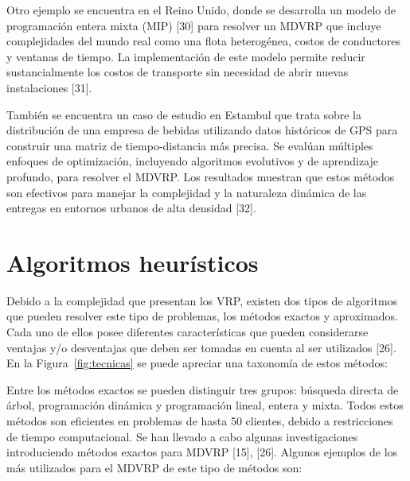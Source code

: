 Otro ejemplo se encuentra en el Reino Unido, donde se desarrolla un modelo de programaci\'on entera mixta (MIP) [30] para resolver un MDVRP que incluye complejidades del mundo real como una flota heterog\'enea, costos de conductores y ventanas de tiempo. La implementaci\'on de este modelo permite reducir sustancialmente los costos de transporte sin necesidad de abrir nuevas instalaciones [31].

Tambi\'en se encuentra un caso de estudio en Estambul que trata sobre la distribuci\'on de una empresa de bebidas utilizando datos hist\'oricos de GPS para construir una matriz de tiempo-distancia m\'as precisa. Se eval\'uan m\'ultiples enfoques de optimizaci\'on, incluyendo algoritmos evolutivos y de aprendizaje profundo, para resolver el MDVRP. Los resultados muestran que estos m\'etodos son efectivos para manejar la complejidad y la naturaleza din\'amica de las entregas en entornos urbanos de alta densidad [32].

\section{Algoritmos heur\'isticos}

Debido a la complejidad que presentan los VRP, existen dos tipos de algoritmos que pueden resolver este tipo de problemas, los m\'etodos exactos y aproximados. Cada uno de ellos posee diferentes caracter\'isticas que pueden considerarse ventajas y/o desventajas que deben ser tomadas en cuenta al ser utilizados [26]. En la Figura~\ref{fig:tecnicas} se puede apreciar una taxonom\'ia de estos m\'etodos:


Entre los m\'etodos exactos se pueden distinguir tres grupos: b\'usqueda directa de \'arbol, programaci\'on din\'amica y programaci\'on lineal, entera y mixta. Todos estos m\'etodos son eficientes en problemas de hasta 50 clientes, debido a restricciones de tiempo computacional. Se han llevado a cabo algunas investigaciones introduciendo m\'etodos exactos para MDVRP [15], [26]. Algunos ejemplos de los m\'as utilizados para el MDVRP de este tipo de m\'etodos son:

